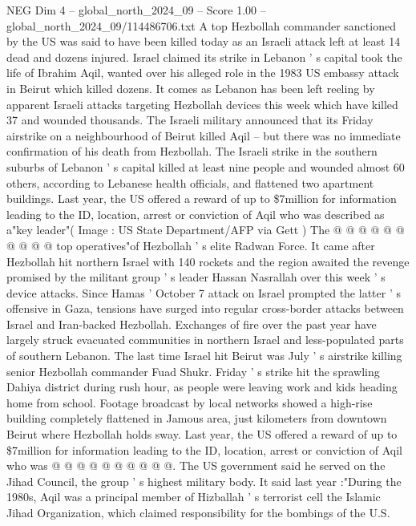 \begin{textsample}{NEG Dim 4 – global\_north\_2024\_09 – Score 1.00 – global\_north\_2024\_09/114486706.txt}  \label{ex:f4_neg_139}
A top Hezbollah commander sanctioned by the US was said to have been killed today as an Israeli attack left at least 14 dead and dozens injured.
Israel claimed its strike in Lebanon ' s capital took the life of Ibrahim Aqil, wanted over his alleged role in the 1983 US embassy attack in Beirut which killed dozens.
It comes as Lebanon has been left reeling by apparent Israeli attacks targeting Hezbollah devices this week which have killed 37 and wounded thousands.
The Israeli military announced that its Friday airstrike on a neighbourhood of Beirut killed Aqil -- but there was no immediate confirmation of his death from Hezbollah.
The Israeli strike in the southern suburbs of Lebanon ' s capital killed at least nine people and wounded almost 60 others, according to Lebanese health officials, and flattened two apartment buildings.
Last year, the US offered a reward of up to \$7million for information leading to the ID, location, arrest or conviction of Aqil who was described as a"key leader"( Image : US State Department/AFP via Gett ) The @ @ @ @ @ @ @ @ @ @ top operatives"of Hezbollah ' s elite Radwan Force.
It came after Hezbollah hit northern Israel with 140 rockets and the region awaited the revenge promised by the militant group ' s leader Hassan Nasrallah over this week ' s device attacks.
Since Hamas ' October 7 attack on Israel prompted the latter ' s offensive in Gaza, tensions have surged into regular cross-border attacks between Israel and Iran-backed Hezbollah.
Exchanges of fire over the past year have largely struck evacuated communities in northern Israel and less-populated parts of southern Lebanon.
The last time Israel hit Beirut was July ' s airstrike killing senior Hezbollah commander Fuad Shukr.
Friday ' s strike hit the sprawling Dahiya district during rush hour, as people were leaving work and kids heading home from school.
Footage broadcast by local networks showed a high-rise building completely flattened in Jamous area, just kilometers from downtown Beirut where Hezbollah holds sway.
Last year, the US offered a reward of up to \$7million for information leading to the ID, location, arrest or conviction of Aqil who was @ @ @ @ @ @ @ @ @ @.
The US government said he served on the Jihad Council, the group ' s highest military body.
It said last year :"During the 1980s, Aqil was a principal member of Hizballah ' s terrorist cell the Islamic Jihad Organization, which claimed responsibility for the bombings of the U.S.

\end{textsample}
